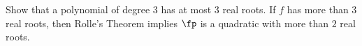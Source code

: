 {Show that a polynomial of degree 3 has at most 3 real roots.}
{If $f$ has more than 3 real roots, then Rolle's Theorem implies $\fp$ is a quadratic with more than $2$ real roots.}